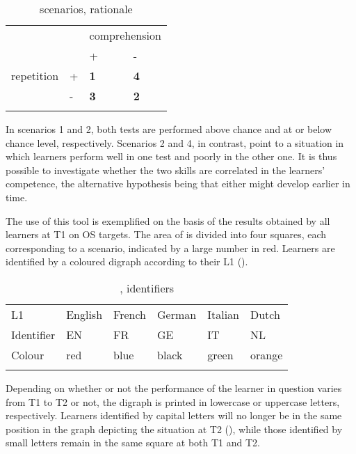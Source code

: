 \begin{table}
    \begin{tabularx}{\textwidth}{XXXX}
         &  & \multicolumn{2}{X}{ comprehension}\\
        \lsptoprule
        &  & + & {}-\\
         repetition & + & \textbf{1} & \textbf{4}\\
        & {}- & \textbf{3} & \textbf{2}\\
        \lspbottomrule
    \end{tabularx}
    \caption{scenarios, rationale}
    \label{tab:06:2}
\end{table}

In scenarios 1 and 2, both tests are performed above chance and at or below chance level, respectively. Scenarios 2 and 4, in contrast, point to a situation in which learners perform well in one test and poorly in the other one. It is thus possible to investigate whether the two skills are correlated in the learners' competence, the alternative hypothesis being that either might develop earlier in time.

The use of this tool is exemplified on the basis of the results obtained by all learners at T1 on OS targets. The area of  is divided into four squares, each corresponding to a scenario, indicated by a large number in red. Learners are identified by a coloured digraph according to their L1 (). 

\begin{table}
    \begin{tabularx}{\textwidth}{XXXXXX}
        \lsptoprule
        L1 & English & French & German & Italian & Dutch\\
        Identifier & EN & FR & GE & IT & NL\\
        Colour & red & blue & black & green & orange\\
        \lspbottomrule
    \end{tabularx}
    \caption{, identifiers}
    \label{tab:06:3}
\end{table}

Depending on whether or not the performance of the learner in question varies from T1 to T2 or not, the digraph is printed in lowercase or uppercase letters, respectively. Learners identified by capital letters will no longer be in the same position in the graph depicting the situation at T2 (), while those identified by small letters remain in the same square at both T1 and T2. 

